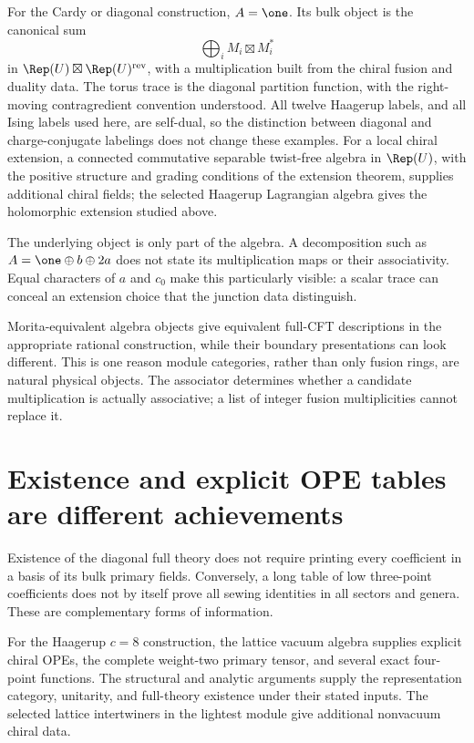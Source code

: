 For the Cardy or diagonal construction, $A=\one$. Its bulk
object is the canonical sum
\[
 \bigoplus_i M_i\boxtimes M_i^*
\]
in $\Rep(U)\boxtimes\Rep(U)^{\rm rev}$, with a multiplication
built from the chiral fusion and duality data. The torus trace is
the diagonal partition function, with the right-moving
contragredient convention understood. All twelve Haagerup labels,
and all Ising labels used here, are self-dual, so the distinction
between diagonal and charge-conjugate labelings does not change
these examples. For a local chiral extension,
a connected commutative separable twist-free algebra in $\Rep(U)$,
with the positive structure and grading conditions of the extension
theorem, supplies additional chiral fields; the selected Haagerup
Lagrangian algebra gives the
holomorphic extension studied above.

The underlying object is only part of the algebra. A decomposition
such as $A=\one\oplus b\oplus2a$ does not state its multiplication
maps or their associativity. Equal characters of $a$ and $c_0$
make this particularly visible: a scalar trace can conceal an
extension choice that the junction data distinguish.

Morita-equivalent algebra objects give equivalent full-CFT
descriptions in the appropriate rational construction, while
their boundary presentations can look different. This is one
reason module categories, rather than only fusion rings, are
natural physical objects. The associator determines whether a
candidate multiplication is actually associative; a list of
integer fusion multiplicities cannot replace it.

\section{Existence and explicit OPE tables are different achievements}

Existence of the diagonal full theory does not require printing
every coefficient in a basis of its bulk primary fields.
Conversely, a long table of low
three-point coefficients does not by itself prove all sewing
identities in all sectors and genera. These are complementary
forms of information.

For the Haagerup $c=8$ construction, the lattice vacuum algebra
supplies explicit chiral OPEs, the complete weight-two primary
tensor, and several exact four-point functions. The structural
and analytic arguments supply the representation category,
unitarity, and full-theory existence under their stated inputs.
The selected lattice intertwiners in the lightest module give
additional nonvacuum chiral data.

